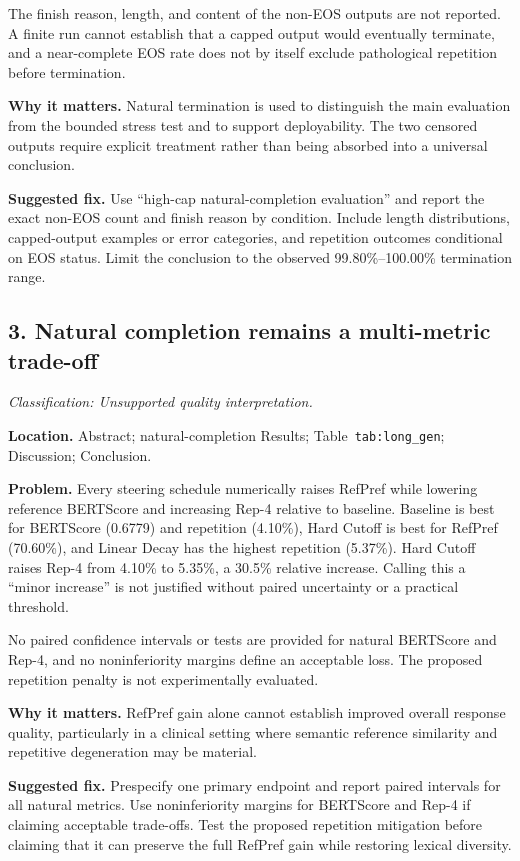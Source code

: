 \documentclass[11pt]{article}
\newcommand{\findinglabel}[1]{\textbf{#1}}
\newcommand{\classification}[1]{\textit{Classification: #1.}}
\begin{document}
The finish reason, length, and content of the non-EOS outputs are not reported.  A finite run cannot establish that a capped output would eventually terminate, and a near-complete EOS rate does not by itself exclude pathological repetition before termination.

\findinglabel{Why it matters.} Natural termination is used to distinguish the main evaluation from the bounded stress test and to support deployability.  The two censored outputs require explicit treatment rather than being absorbed into a universal conclusion.

\findinglabel{Suggested fix.} Use ``high-cap natural-completion evaluation'' and report the exact non-EOS count and finish reason by condition.  Include length distributions, capped-output examples or error categories, and repetition outcomes conditional on EOS status.  Limit the conclusion to the observed 99.80\%--100.00\% termination range.

\subsection*{3. Natural completion remains a multi-metric trade-off}

\classification{Unsupported quality interpretation}

\findinglabel{Location.} Abstract; natural-completion Results; Table~\texttt{tab:long\_gen}; Discussion; Conclusion.

\findinglabel{Problem.} Every steering schedule numerically raises RefPref while lowering reference BERTScore and increasing Rep-4 relative to baseline.  Baseline is best for BERTScore (0.6779) and repetition (4.10\%), Hard Cutoff is best for RefPref (70.60\%), and Linear Decay has the highest repetition (5.37\%).  Hard Cutoff raises Rep-4 from 4.10\% to 5.35\%, a 30.5\% relative increase.  Calling this a ``minor increase'' is not justified without paired uncertainty or a practical threshold.

No paired confidence intervals or tests are provided for natural BERTScore and Rep-4, and no noninferiority margins define an acceptable loss.  The proposed repetition penalty is not experimentally evaluated.

\findinglabel{Why it matters.} RefPref gain alone cannot establish improved overall response quality, particularly in a clinical setting where semantic reference similarity and repetitive degeneration may be material.

\findinglabel{Suggested fix.} Prespecify one primary endpoint and report paired intervals for all natural metrics.  Use noninferiority margins for BERTScore and Rep-4 if claiming acceptable trade-offs.  Test the proposed repetition mitigation before claiming that it can preserve the full RefPref gain while restoring lexical diversity.
\end{document}
